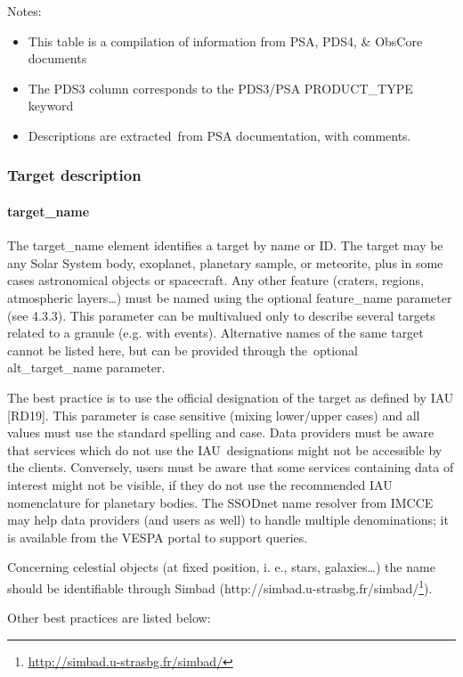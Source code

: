 \documentclass[11pt,a4paper]{ivoa}
\begin{document}
Notes:

\begin{itemize}
\item This table is a compilation of information from PSA, PDS4, \& ObsCore documents
\item The PDS3 column corresponds to the PDS3/PSA PRODUCT\_TYPE keyword
\item Descriptions are extracted from PSA documentation, with comments.
\end{itemize}

\subsubsection{Target description}

\paragraph{target\_name}

The target\_name element identifies a target by name or ID. The target may be any Solar System body, exoplanet, planetary sample, or meteorite, plus in some cases astronomical objects or spacecraft. Any other feature (craters, regions, atmospheric layers…) must be named using the optional feature\_name parameter (see 4.3.3). This parameter can be multivalued only to describe several targets related to a granule (e.g. with events). Alternative names of the same target cannot be listed here, but can be provided through the optional alt\_target\_name parameter. 

The best practice is to use the official designation of the target as defined by IAU [RD19]. This parameter is case sensitive (mixing lower/upper cases) and all values must use the standard spelling and case. Data providers must be aware that services which do not use the IAU designations might not be accessible by the clients. Conversely, users must be aware that some services containing data of interest might not be visible, if they do not use the recommended IAU nomenclature for planetary bodies. The SSODnet name resolver from IMCCE may help data providers (and users as well) to handle multiple denominations; it is available from the VESPA portal to support queries.

Concerning celestial objects (at fixed position, i. e., stars, galaxies…) the name should be identifiable through Simbad (http://simbad.u-strasbg.fr/simbad/\footnote{\url{http://simbad.u-strasbg.fr/simbad/}}).

Other best practices are listed below:
\end{document}
